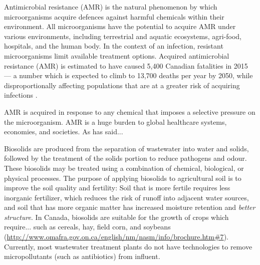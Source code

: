 Antimicrobial resistance (AMR) is the natural phenomenon by which microorganisms acquire defences against harmful chemicals within their environment.
All microorganisms have the potential to acquire AMR under various environments, including terrestrial and aquatic ecosystems, agri-food, hospitals, and the human body.
In the context of an infection, resistant microorganisms limit available treatment options.
Acquired antimicrobial resistance (AMR) is estimated to have caused 5,400 Canadian fatalities in 2015 — a number which is expected to climb to 13,700 deaths per year by 2050, while disproportionally affecting populations that are at a greater risk of acquiring infections \parencite{councilofcanadianacademiesWhenAntibioticsFail2019}.

AMR is acquired in response to any chemical that imposes a selective pressure on the microorganism.
AMR is a huge burden to global healthcare systems, economies, and societies.
As \textcite{buongerminopereiraComprehensiveSurveyIntegronassociated2020} has said...

Biosolids are produced from the separation of wastewater into water and solids, followed by the treatment of the solids portion to reduce pathogens and odour.
These biosolids may be treated using a combination of chemical, biological, or physical processes.
The purpose of applying biosolids to agricultural soil is to improve the soil quality and fertility:
Soil that is more fertile requires less inorganic fertilizer, which reduces the risk of runoff into adjacent water sources, and soil that has more organic matter has increased moisture retention and \textit{better structure}.
In Canada, biosolids are suitable for the growth of crops which require... such as cereals, hay, field corn, and soybeans (\url{http://www.omafra.gov.on.ca/english/nm/nasm/info/brochure.htm#7}).
Currently, most wastewater treatment plants do not have technologies to remove micropollutants (such as antibiotics) from influent.
